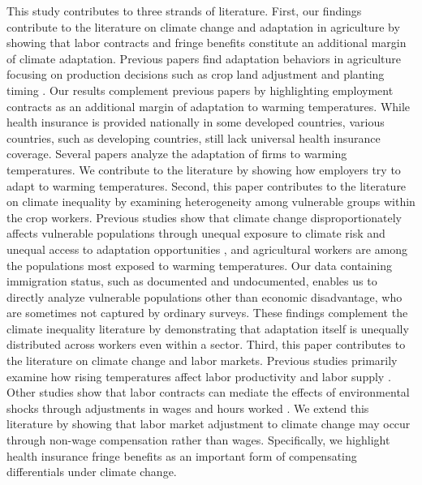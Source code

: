 \documentclass[12pt]{article}
\begin{document}
This study contributes to three strands of literature. First, our findings contribute to the literature on climate change and adaptation in agriculture by showing that labor contracts and fringe benefits constitute an additional margin of climate adaptation. Previous papers find adaptation behaviors in agriculture focusing on production decisions such as crop land adjustment and planting timing \citep{cui_climate_2020, cui_beyond_2020, cui_adapting_2022}. Our results complement previous papers by highlighting employment contracts as an additional margin of adaptation to warming temperatures. While health insurance is provided nationally in some developed countries, various countries, such as developing countries, still lack universal health insurance coverage. Several papers analyze the adaptation of firms to warming temperatures. We contribute to the literature by showing how employers try to adapt to warming temperatures. 
Second, this paper contributes to the literature on climate inequality by examining heterogeneity among vulnerable groups within the crop workers. Previous studies show that climate change disproportionately affects vulnerable populations through unequal exposure to climate risk and unequal access to adaptation opportunities \citep{park_temperature_2021, rode_workplace_2024, barreca_adapting_2016, zahnow_climate_2025, dang_does_2024}, and agricultural workers are among the populations most exposed to warming temperatures. Our data containing immigration status, such as documented and undocumented, enables us to directly analyze vulnerable populations other than economic disadvantage, who are sometimes not captured by ordinary surveys. These findings complement the climate inequality literature by demonstrating that adaptation itself is unequally distributed across workers even within a sector.
Third, this paper contributes to the literature on climate change and labor markets. Previous studies primarily examine how rising temperatures affect labor productivity \citep{somanathan_impact_2021} and labor supply \citep{graff_zivin_temperature_2014, colmer_temperature_2021}. Other studies show that labor contracts can mediate the effects of environmental shocks through adjustments in wages and hours worked \citep{franklin_economic_2019}. We extend this literature by showing that labor market adjustment to climate change may occur through non-wage compensation rather than wages. Specifically, we highlight health insurance fringe benefits as an important form of compensating differentials under climate change.
\end{document}
